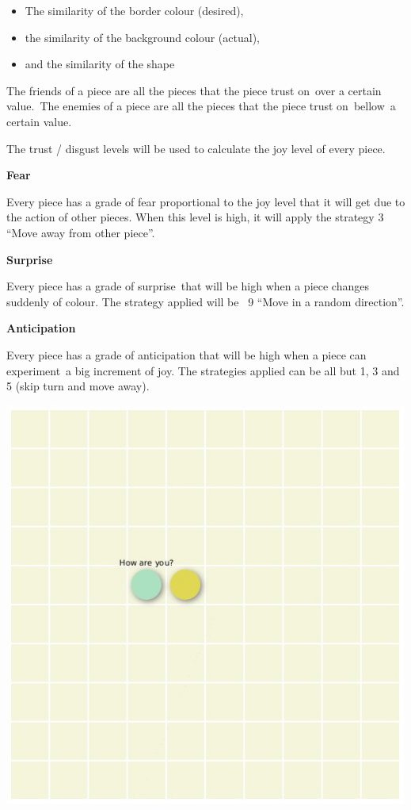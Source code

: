 \documentclass[a4paper]{article}
\newcommand\textstyleStrongEmphasis[1]{\textbf{#1}}
\newcommand\liststyleLxvi{%
\renewcommand\labelitemi{{\textbullet}}
\renewcommand\labelitemii{{\textbullet}}
\renewcommand\labelitemiii{{\textbullet}}
\renewcommand\labelitemiv{{\textbullet}}
}
\begin{document}
\liststyleLxvi
\begin{itemize}
\item The similarity of the border colour (desired), 
\item the similarity of the background colour (actual), 
\item and the similarity of the shape 
\end{itemize}
The friends of a piece are all the pieces that the piece trust on~over a
certain value.~The enemies of a piece are all the pieces that the piece
trust on~bellow~a certain value.

The trust / disgust levels will be used to calculate the joy level of
every piece.

\textstyleStrongEmphasis{Fear}

Every piece has a grade of fear proportional to the joy level that it
will get due to the action of other pieces. When this level is high, it
will apply the strategy 3 {\textquotedblleft}Move away from other
piece{\textquotedblright}.

\textstyleStrongEmphasis{Surprise}

Every piece has a grade of surprise~that will be high when a piece
changes suddenly of colour. The strategy applied will be ~9
{\textquotedblleft}Move in a random direction{\textquotedblright}.

\textstyleStrongEmphasis{Anticipation}

Every piece has a grade of anticipation that will be high when a piece
can experiment~a big increment of joy. The strategies applied can be
all but 1, 3 and 5 (skip turn and move away).

\href{http://www.velonuboso.com/made/blog/wp-content/uploads/2015/07/player1.jpg}{
\includegraphics[width=13.282cm,height=13.282cm]{makingofmade113-img17.jpg}
}
\end{document}
